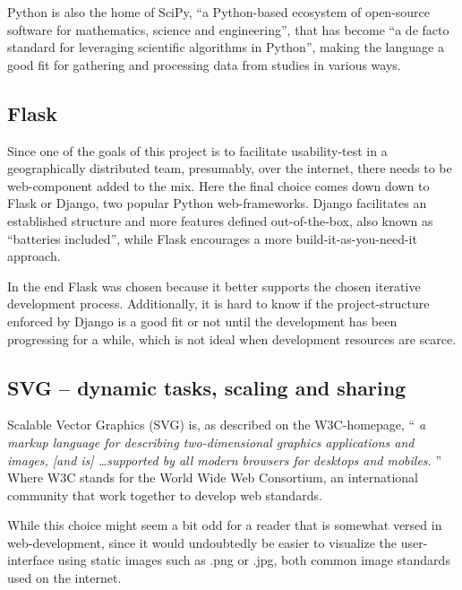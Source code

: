 {  Python is also the home of SciPy, ``a Python-based ecosystem of open-source
  software for mathematics, science and engineering''\cite{citeSciPyHomepage},
  that has become ``a de facto
  standard for leveraging scientific algorithms in
  Python''\cite{citeSciPyPaper}, making the language a good fit for gathering
  and processing data from studies in various ways.

  \subsection{Flask}

  Since one of the goals of this project is to facilitate usability-test in a
  geographically distributed team, presumably, over the internet, there
  needs to be web-component added to the mix. Here the final choice comes down
  down to Flask\cite{citeFlaskHomepage} or Django\cite{citeDjangoHomepage},
  two popular Python web-frameworks. Django facilitates an established
  structure and more features defined out-of-the-box, also known as ``batteries
  included'', while Flask encourages a more build-it-as-you-need-it approach.

  In the end Flask was chosen because it better supports the chosen iterative
  development process. Additionally, it is hard to know if the
  project-structure enforced by Django is a good fit or not until the
  development has been progressing for a while, which is not ideal when
  development resources are scarce.


%
%

  \subsection{SVG -- dynamic tasks, scaling and
  sharing}\label{label_svg_section}

  Scalable Vector Graphics (SVG) is, as described on the W3C-homepage, ``%
  \textit{%
    a markup language for describing two-dimensional graphics applications and
    images, [and is] \ldots supported by all modern browsers for desktops and
    mobiles.%
  }''\cite{citeW3CSVG}
  Where W3C stands for the World Wide Web Consortium, an international
  community that work together to develop web standards\cite{citeW3CHomepage}.

  While this choice might seem a bit odd for a reader that is somewhat versed
  in web-development, since it would undoubtedly be easier to visualize the
  user-interface using static images such as .png or .jpg, both common image
  standards used on the internet.

}
